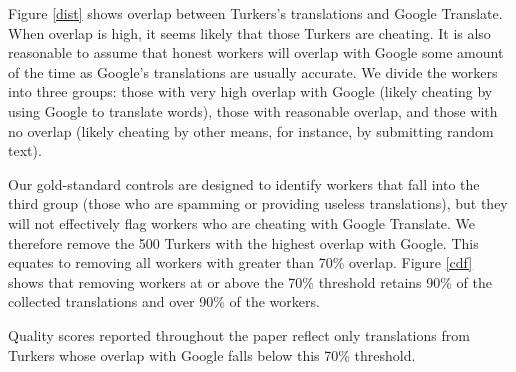 \documentclass[11pt]{article}
\begin{document}
Figure \ref{dist} shows overlap between Turkers's translations and Google Translate.  When overlap is high, it seems likely that those Turkers are cheating.  It is also reasonable to assume that honest workers will overlap with Google some amount of the time as Google's translations are usually accurate. We divide the workers into three groups: those with very high overlap with Google (likely cheating by using Google to translate words), those with reasonable overlap, and those with no overlap (likely cheating by other means, for instance, by submitting random text).  
 
Our gold-standard controls are designed to identify workers that fall into the third group (those who are spamming or providing useless translations), but they will not effectively flag workers who are cheating with Google Translate. We therefore remove the 500 Turkers with the highest overlap with Google. This equates to removing all workers with greater than 70\% overlap. Figure \ref{cdf} shows that removing workers at or above the 70\% threshold retains 90\% of the collected translations and over 90\% of the workers.

Quality scores reported throughout the paper reflect only translations from Turkers whose overlap with Google falls below this 70\% threshold.
\end{document}
